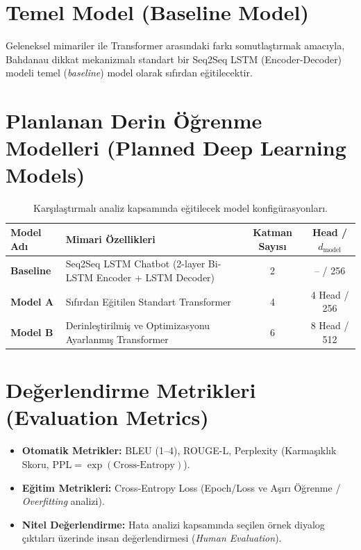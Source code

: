 \documentclass[11pt,a4paper]{article}
\begin{document}
\section{Temel Model (Baseline Model)}
Geleneksel mimariler ile Transformer arasındaki farkı somutlaştırmak amacıyla, Bahdanau dikkat mekanizmalı standart bir Seq2Seq LSTM (Encoder-Decoder) modeli temel (\textit{baseline}) model olarak sıfırdan eğitilecektir.

\section{Planlanan Derin Öğrenme Modelleri (Planned Deep Learning Models)}
\begin{table}[h!]
    \centering
    \small
    \begin{tabularx}{\textwidth}{l p{7.5cm} c c}
        \toprule
        \textbf{Model Adı} & \textbf{Mimari Özellikleri} & \textbf{Katman Sayısı} & \textbf{Head / $d_{\text{model}}$} \\
        \midrule
        \textbf{Baseline} & Seq2Seq LSTM Chatbot (2-layer Bi-LSTM Encoder + LSTM Decoder) & 2 & -- / 256 \\
        \textbf{Model A} & Sıfırdan Eğitilen Standart Transformer & 4 & 4 Head / 256 \\
        \textbf{Model B} & Derinleştirilmiş ve Optimizasyonu Ayarlanmış Transformer & 6 & 8 Head / 512 \\
        \bottomrule
    \end{tabularx}
    \caption{Karşılaştırmalı analiz kapsamında eğitilecek model konfigürasyonları.}
\end{table}

\section{Değerlendirme Metrikleri (Evaluation Metrics)}
\begin{itemize}
    \item \textbf{Otomatik Metrikler:} BLEU (1--4), ROUGE-L, Perplexity (Karmaşıklık Skoru, $\text{PPL} = \exp(\text{Cross-Entropy})$).
    \item \textbf{Eğitim Metrikleri:} Cross-Entropy Loss (Epoch/Loss ve Aşırı Öğrenme / \textit{Overfitting} analizi).
    \item \textbf{Nitel Değerlendirme:} Hata analizi kapsamında seçilen örnek diyalog çıktıları üzerinde insan değerlendirmesi (\textit{Human Evaluation}).
\end{itemize}
\end{document}
